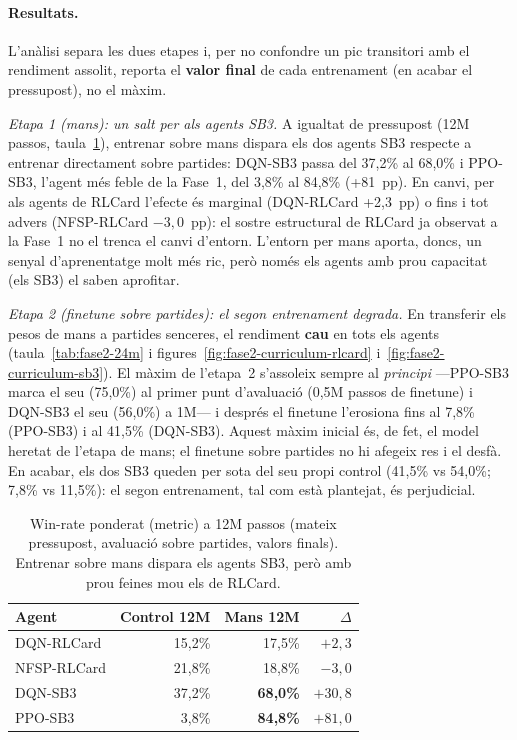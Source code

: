 \paragraph{Resultats.} L'anàlisi separa les dues etapes i, per no confondre un pic
transitori amb el rendiment assolit, reporta el \textbf{valor final} de cada entrenament
(en acabar el pressupost), no el màxim.

\emph{Etapa 1 (mans): un salt per als agents \ac{SB3}.} A igualtat de pressupost (12M
passos, taula~\ref{tab:fase2-12m}), entrenar sobre mans dispara els dos agents \ac{SB3}
respecte a entrenar directament sobre partides: DQN-SB3 passa del 37{,}2\% al 68{,}0\% i
PPO-SB3, l'agent més feble de la Fase~1, del 3{,}8\% al 84{,}8\% (+81~pp). En canvi, per als
agents de RLCard l'efecte és marginal (DQN-RLCard +2{,}3~pp) o fins i tot advers
(NFSP-RLCard $-3{,}0$~pp): el sostre estructural de RLCard ja observat a la Fase~1 no el
trenca el canvi d'entorn. L'entorn per mans aporta, doncs, un senyal d'aprenentatge molt
més ric, però només els agents amb prou capacitat (els \ac{SB3}) el saben aprofitar.

\emph{Etapa 2 (finetune sobre partides): el segon entrenament degrada.} En transferir els
pesos de mans a partides senceres, el rendiment \textbf{cau} en tots els agents
(taula~\ref{tab:fase2-24m} i figures~\ref{fig:fase2-curriculum-rlcard}
i~\ref{fig:fase2-curriculum-sb3}). El màxim de l'etapa~2 s'assoleix sempre al
\emph{principi} —PPO-SB3 marca el seu (75{,}0\%) al primer punt d'avaluació (0{,}5M passos
de finetune) i DQN-SB3 el seu (56{,}0\%) a 1M— i després el finetune l'erosiona fins al
7{,}8\% (PPO-SB3) i al 41{,}5\% (DQN-SB3). Aquest màxim inicial és, de fet, el model heretat
de l'etapa de mans; el finetune sobre partides no hi afegeix res i el desfà. En acabar, els
dos \ac{SB3} queden per sota del seu propi control (41{,}5\% vs 54{,}0\%; 7{,}8\% vs
11{,}5\%): el segon entrenament, tal com està plantejat, és perjudicial.

\begin{table}[H]
  \centering
  \begin{tabular}{lrrr}
    \toprule
    Agent & Control 12M & Mans 12M & $\Delta$ \\
    \midrule
    DQN-RLCard  & 15{,}2\% & 17{,}5\% & $+2{,}3$ \\
    NFSP-RLCard & 21{,}8\% & 18{,}8\% & $-3{,}0$ \\
    DQN-SB3     & 37{,}2\% & \textbf{68{,}0\%} & $+30{,}8$ \\
    PPO-SB3     & 3{,}8\%  & \textbf{84{,}8\%} & $+81{,}0$ \\
    \bottomrule
  \end{tabular}
  \caption[Win-rate a 12M passos, protocol de mans (Fase~2).]{Win-rate ponderat (\(\text{metric}\)) a 12M passos (mateix pressupost, avaluació
           sobre partides, valors finals). Entrenar sobre mans dispara els agents \ac{SB3},
           però amb prou feines mou els de RLCard.}
  \label{tab:fase2-12m}
\end{table}

